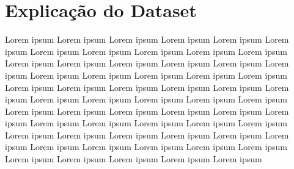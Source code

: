 \section{Explicação do Dataset}

Lorem ipsum Lorem ipsum Lorem ipsum Lorem ipsum Lorem ipsum Lorem ipsum Lorem ipsum Lorem ipsum Lorem ipsum Lorem ipsum Lorem ipsum Lorem ipsum Lorem ipsum Lorem ipsum Lorem ipsum Lorem ipsum Lorem ipsum Lorem ipsum Lorem ipsum Lorem ipsum Lorem ipsum Lorem ipsum Lorem ipsum Lorem ipsum Lorem ipsum Lorem ipsum Lorem ipsum Lorem ipsum Lorem ipsum Lorem ipsum Lorem ipsum Lorem ipsum Lorem ipsum Lorem ipsum Lorem ipsum Lorem ipsum Lorem ipsum Lorem ipsum Lorem ipsum Lorem ipsum Lorem ipsum Lorem ipsum Lorem ipsum Lorem ipsum Lorem ipsum Lorem ipsum Lorem ipsum Lorem ipsum Lorem ipsum Lorem ipsum Lorem ipsum Lorem ipsum Lorem ipsum Lorem ipsum Lorem ipsum Lorem ipsum Lorem ipsum Lorem ipsum Lorem ipsum Lorem ipsum 
